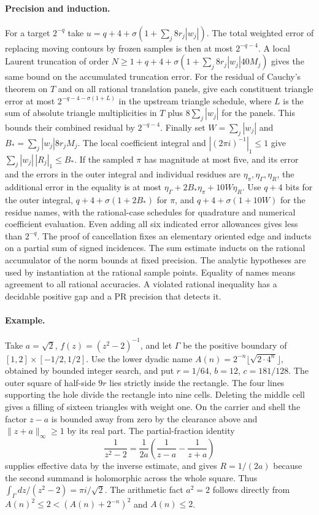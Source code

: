 \paragraph{Precision and induction.}
For a target $2^{-q}$ take
$u=q+4+\sigma(1+\sum_j8r_j|w_j|)$. The total weighted error of replacing
moving contours by frozen samples is then at most $2^{-q-4}$.
A local Laurent truncation of order
$N\ge1+q+4+\sigma(1+\sum_j 8r_j|w_j|40M_j)$ gives the same
bound on the accumulated truncation error. For the residual of Cauchy's theorem on $T$ and on all rational
translation panels, give each constituent triangle error at most
$2^{-q-4-\sigma(1+L)}$ in the upstream triangle schedule, where $L$
is the sum of absolute triangle multiplicities in $T$ plus
$8\sum_j|w_j|$ for the panels. This bounds their combined residual by
$2^{-q-4}$. Finally set $W=\sum_j|w_j|$ and
$B_*=\sum_j |w_j|8r_jM_j$. The local coefficient integral and
$|(2\pi i)^{-1}|_1\le1$ give $\sum_j|w_j|\,|R_j|_1\le B_*$.
If the sampled $\pi$ has magnitude at most five, and its error and the
errors in the outer integral and individual residues are
$\eta_\pi,\eta_\Gamma,\eta_R$, the additional error in the equality is
at most $\eta_\Gamma+2B_*\eta_\pi+10W\eta_R$. Use $q+4$ bits for the
outer integral, $q+4+\sigma(1+2B_*)$ for $\pi$, and
$q+4+\sigma(1+10W)$ for the residue names, with the rational-case
schedules for quadrature and numerical coefficient evaluation. Even
adding all six indicated error allowances gives less than $2^{-q}$.
The proof of cancellation fixes an elementary oriented edge and inducts
on a partial sum of signed incidences. The sum estimate inducts on the
rational accumulator of the norm bounds at fixed precision. The
analytic hypotheses are used by instantiation at the rational sample
points. Equality of names means agreement to all rational accuracies.
A violated rational inequality has a decidable positive gap and a PR
precision that detects it.

\paragraph{Example.}
Take $a=\sqrt2$, $f(z)=(z^2-2)^{-1}$, and let $\Gamma$ be the positive
boundary of $[1,2]\times[-1/2,1/2]$. Use the lower dyadic name
$A(n)=2^{-n}\lfloor\sqrt{2\cdot 4^n}\rfloor$, obtained by bounded
integer search, and put $r=1/64$, $b=12$, $c=181/128$.
The outer square of half-side $9r$ lies strictly inside the rectangle.
The four lines supporting the hole divide the rectangle into nine cells.
Deleting the middle cell gives a filling of sixteen triangles with
weight one. On the carrier and shell the factor $z-a$ is bounded away
from zero by the clearance above and $\lVert z+a\rVert_\infty\ge1$
by its real part. The partial-fraction identity
\[
 \frac1{z^2-2}=\frac1{2a}\left(\frac1{z-a}-\frac1{z+a}\right)
\]
supplies effective data by the inverse estimate, and gives
$R=1/(2a)$ because the second summand is holomorphic across the
whole square. Thus $\int_\Gamma dz/(z^2-2)=\pi i/\sqrt2$.
The arithmetic fact $a^2=2$ follows directly from
$A(n)^2\le2<(A(n)+2^{-n})^2$ and $A(n)\le2$.

